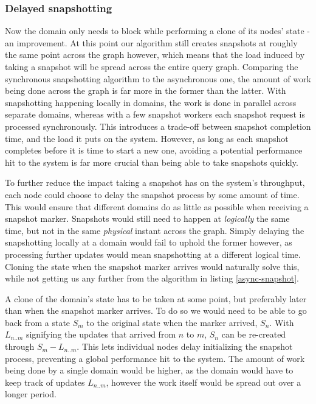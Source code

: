 \documentclass[b5paper]{report}
\begin{document}
\subsubsection{Delayed snapshotting} \label{sec:delay-snapshot}
Now the domain only needs to block while performing a clone of its nodes' state
- an improvement. At this point our algorithm still creates snapshots at roughly
the same point across the graph however, which means that the load induced by
taking a snapshot will be spread across the entire query graph. Comparing the
synchronous snapshotting algorithm to the asynchronous one, the amount of work
being done across the graph is far more in the former than the latter. With
snapshotting happening locally in domains, the work is done in parallel across
separate domains, whereas with a few snapshot workers each snapshot request is
processed synchronously. This introduces a trade-off between snapshot completion
time, and the load it puts on the system. However, as long as each snapshot completes
before it is time to start a new one, avoiding a potential performance hit to
the system is far more crucial than being able to take snapshots quickly.

To further reduce the impact taking a snapshot has on the system's throughput,
each node could choose to delay the snapshot process by some amount of time.
This would ensure that different domains do as little as possible when receiving
a snapshot marker. Snapshots would still need to happen at \textit{logically} the same
time, but not in the same \textit{physical} instant across the graph. Simply
delaying the snapshotting locally at a domain would fail to uphold the former
however, as processing further updates would mean snapshotting at a different
logical time. Cloning the state when the snapshot marker arrives would naturally
solve this, while not getting us any further from the algorithm in listing
\ref{async-snapshot}.

A clone of the domain's state has to be taken at some point, but
preferably later than when the snapshot marker arrives. To do so we would need
to be able to go back from a state $ S_m $ to the original state when the marker
arrived, $ S_n $. With $ L_{n..m} $ signifying the updates that arrived from $ n
$ to $ m $, $ S_n $ can be re-created through $ S_m - L_{n..m} $. This lets
individual nodes delay initializing the snapshot process, preventing a global
performance hit to the system. The amount of work being done by a single domain
would be higher, as the domain would have to keep track of updates $ L_{n..m} $,
however the work itself would be spread out over a longer period.
\end{document}
